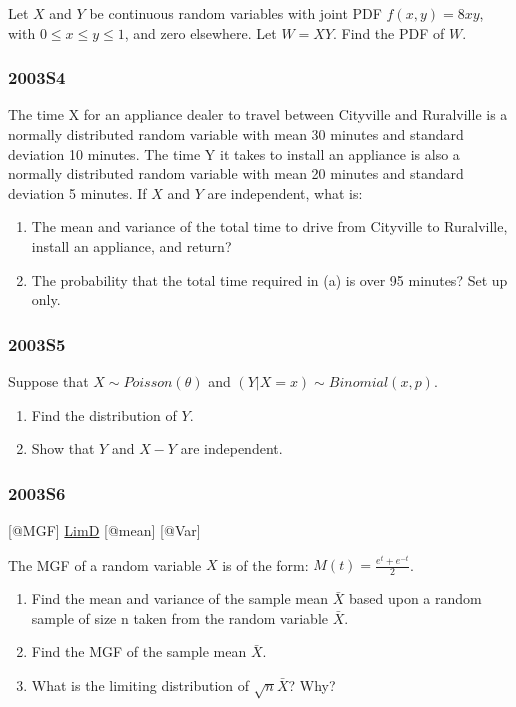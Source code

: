 \documentclass[10pt,twocolumn,portrait]{article}
\begin{document}
Let \(X\) and \(Y\) be continuous random variables with joint PDF
\(f(x,y)=8xy\), with \(0\le x\le y\le1\), and zero elsewhere. Let
\(W=XY\). Find the PDF of \(W\).

\hypertarget{s4}{%
\subsubsection{2003S4}\label{s4}}

The time X for an appliance dealer to travel between Cityville and
Ruralville is a normally distributed random variable with mean 30
minutes and standard deviation 10 minutes. The time Y it takes to
install an appliance is also a normally distributed random variable with
mean 20 minutes and standard deviation 5 minutes. If \(X\) and \(Y\) are
independent, what is:

\begin{enumerate}
\def\labelenumi{\Alph{enumi})}
\item
  The mean and variance of the total time to drive from Cityville to
  Ruralville, install an appliance, and return?
\item
  The probability that the total time required in (a) is over 95
  minutes? Set up only.
\end{enumerate}

\hypertarget{s5}{%
\subsubsection{2003S5}\label{s5}}

Suppose that \(X\sim Poisson(\theta)\) and
\((Y|X=x)\sim Binomial(x,p)\).

\begin{enumerate}
\def\labelenumi{\Alph{enumi})}
\item
  Find the distribution of \(Y\).
\item
  Show that \(Y\) and \(X-Y\) are independent.
\end{enumerate}

\hypertarget{s6}{%
\subsubsection{2003S6}\label{s6}}

{[}@MGF{]} \protect\hyperlink{LimD}{LimD} {[}@mean{]} {[}@Var{]}

The MGF of a random variable \(X\) is of the form:
\(M(t)=\frac{e^t+e^{-t}}2\).

\begin{enumerate}
\def\labelenumi{\Alph{enumi})}
\item
  Find the mean and variance of the sample mean \(\bar X\) based upon a
  random sample of size n taken from the random variable \(\bar X\).
\item
  Find the MGF of the sample mean \(\bar X\).
\item
  What is the limiting distribution of \(\sqrt{n}\bar X\)? Why?
\end{enumerate}
\end{document}
